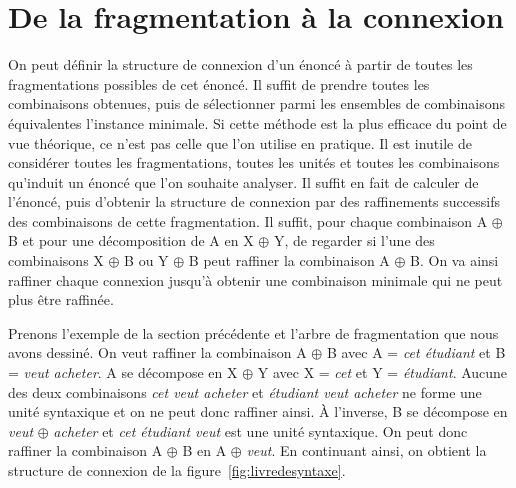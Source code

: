 \section{De la fragmentation à la connexion}\label{sec:3.2.22}

On peut définir la structure de connexion d’un énoncé à partir de toutes les fragmentations possibles de cet énoncé. Il suffit de prendre toutes les combinaisons obtenues, puis de sélectionner parmi les ensembles de combinaisons équivalentes l’instance minimale. Si cette méthode est la plus efficace du point de vue théorique, ce n’est pas celle que l’on utilise en pratique. Il est inutile de considérer toutes les fragmentations, toutes les unités et toutes les combinaisons qu’induit un énoncé que l’on souhaite analyser. Il suffit en fait de calculer   de l’énoncé, puis d’obtenir la structure de connexion par des raffinements successifs des combinaisons de cette fragmentation. Il suffit, pour chaque combinaison A ${\oplus}$ B et pour une décomposition de A en X ${\oplus}$ Y, de regarder si l’une des combinaisons X ${\oplus}$ B ou Y ${\oplus}$ B peut raffiner la combinaison A ${\oplus}$ B. On va ainsi raffiner chaque connexion jusqu’à obtenir une combinaison minimale qui ne peut plus être raffinée.

Prenons l’exemple de la section précédente et l’arbre de fragmentation que nous avons dessiné. On veut raffiner la combinaison A ${\oplus}$ B avec A = \textit{cet étudiant} et B = \textit{veut acheter}. A se décompose en X ${\oplus}$ Y avec X = \textit{cet} et Y = \textit{étudiant}. Aucune des deux combinaisons \textit{cet veut acheter} et \textit{étudiant veut acheter} ne forme une unité syntaxique et on ne peut donc raffiner ainsi. À l’inverse, B se décompose en \textit{veut} ${\oplus}$ \textit{acheter} et \textit{cet étudiant veut} est une unité syntaxique. On peut donc raffiner la combinaison A ${\oplus}$ B en A ${\oplus}$ \textit{veut}. En continuant ainsi, on obtient la structure de connexion de la figure~\ref{fig:livredesyntaxe}.


